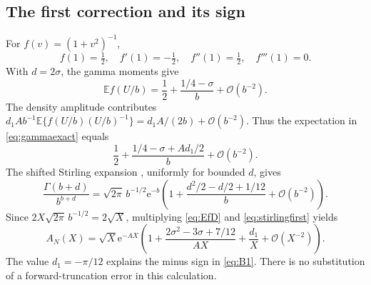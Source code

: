 \documentclass[11pt,a4paper]{article}
\theoremstyle{definition}
\numberwithin{equation}{section}
\newcommand{\ee}{\mathrm{e}}
\newcommand{\Oh}{\mathcal O}
\newcommand{\E}{\mathbb E}
\begin{document}
\subsection{The first correction and its sign}
For $f(v)=(1+v^2)^{-1}$,
\[
 f(1)=\tfrac12,\quad f'(1)=-\tfrac12,\quad
 f''(1)=\tfrac12,\quad f'''(1)=0.
\]
With $d=2\sigma$, the gamma moments give
\begin{equation}
 \E f(U/b)=\frac12+\frac{1/4-\sigma}{b}+\Oh(b^{-2}).
 \label{eq:Ef}
\end{equation}
The density amplitude contributes
$d_1 A b^{-1}\E\{f(U/b)(U/b)^{-1}\}
=d_1A/(2b)+\Oh(b^{-2})$.
Thus the expectation in \eqref{eq:gammaexact} equals
\begin{equation}
 \frac12+\frac{1/4-\sigma+Ad_1/2}{b}+\Oh(b^{-2}).
 \label{eq:EfD}
\end{equation}
The shifted Stirling expansion \cite{dlmf511}, uniformly for bounded
$d$, gives
\begin{equation}
 \frac{\Gamma(b+d)}{b^{b+d}}
 =\sqrt{2\pi}\,b^{-1/2}\ee^{-b}
 \left(1+\frac{d^2/2-d/2+1/12}{b}+\Oh(b^{-2})\right).
 \label{eq:stirlingfirst}
\end{equation}
Since $2X\sqrt{2\pi}\,b^{-1/2}=2\sqrt X$, multiplying
\eqref{eq:EfD} and \eqref{eq:stirlingfirst} yields
\[
 A_N(X)=\sqrt X\ee^{-AX}
 \left(1+\frac{2\sigma^2-3\sigma+7/12}{AX}
                    +\frac{d_1}{X}+\Oh(X^{-2})\right).
\]
The value $d_1=-\pi/12$ explains the minus sign in \eqref{eq:B1}.
There is no substitution of a forward-truncation error in this calculation.
\end{document}
